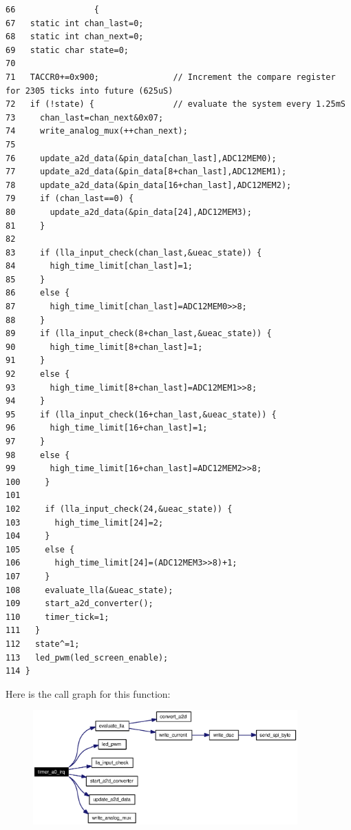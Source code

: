 \footnotesize\begin{verbatim}66                {
67   static int chan_last=0;
68   static int chan_next=0;
69   static char state=0;
70 
71   TACCR0+=0x900;               // Increment the compare register for 2305 ticks into future (625uS)
72   if (!state) {                // evaluate the system every 1.25mS 
73     chan_last=chan_next&0x07;
74     write_analog_mux(++chan_next);
75 
76     update_a2d_data(&pin_data[chan_last],ADC12MEM0);
77     update_a2d_data(&pin_data[8+chan_last],ADC12MEM1);
78     update_a2d_data(&pin_data[16+chan_last],ADC12MEM2);
79     if (chan_last==0) {
80       update_a2d_data(&pin_data[24],ADC12MEM3);
81     }
82 
83     if (lla_input_check(chan_last,&ueac_state)) {
84       high_time_limit[chan_last]=1;
85     }
86     else {
87       high_time_limit[chan_last]=ADC12MEM0>>8;
88     }
89     if (lla_input_check(8+chan_last,&ueac_state)) {
90       high_time_limit[8+chan_last]=1;
91     }
92     else {
93       high_time_limit[8+chan_last]=ADC12MEM1>>8;
94     }
95     if (lla_input_check(16+chan_last,&ueac_state)) {
96       high_time_limit[16+chan_last]=1;
97     }
98     else {
99       high_time_limit[16+chan_last]=ADC12MEM2>>8;
100     }
101 
102     if (lla_input_check(24,&ueac_state)) {
103       high_time_limit[24]=2;
104     }
105     else {
106       high_time_limit[24]=(ADC12MEM3>>8)+1;
107     }
108     evaluate_lla(&ueac_state);
109     start_a2d_converter();
110     timer_tick=1;
111   }
112   state^=1;
113   led_pwm(led_screen_enable);
114 }
\end{verbatim}\normalsize 




Here is the call graph for this function:\begin{figure}[H]
\begin{center}
\leavevmode
\includegraphics[width=288pt]{timer_8c_a0_cgraph}
\end{center}
\end{figure}
